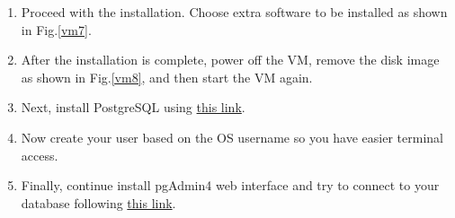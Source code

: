 \documentclass{homework}
\begin{document}
\begin{enumerate}
    \item Proceed with the installation. Choose extra software to be installed as shown in Fig.\ref{vm7}.
    
    \item After the installation is complete, power off the VM, remove the disk image as shown in Fig.\ref{vm8}, and then start the VM again.
    
    \item Next, install PostgreSQL using \href{https://www.tecmint.com/install-postgresql-and-pgadmin-in-ubuntu/}{this link}.
    \item Now create your user based on the OS username so you have easier terminal access.
    \newpage
    
    \item Finally, continue install pgAdmin4 web interface and try to connect to your database following \href{https://www.tecmint.com/install-postgresql-and-pgadmin-in-ubuntu/}{this link}.
    
\end{enumerate}









% 


% 
% 
\end{document}
